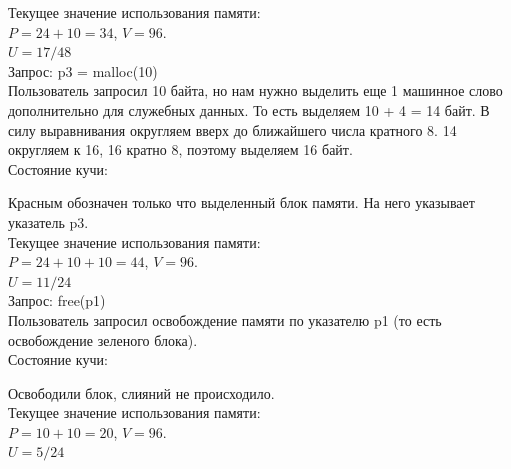 \documentclass[12pt, letterpaper]{article}
\begin{document}
Текущее значение использования памяти:\\
$P=24 + 10 = 34$, $V=96$.\\ 
$U=17/48$\\

Запрос: p3 = malloc(10)\\
Пользователь запросил 10 байта, но нам нужно выделить еще 1 машинное слово дополнительно для служебных данных. То есть выделяем 10 + 4 = 14 байт. В силу выравнивания округляем вверх до ближайшего числа кратного 8. 14 округляем к 16, 16 кратно 8, поэтому выделяем 16 байт.\\
Состояние кучи:
\begin{center}
\end{center}
Красным обозначен только что выделенный блок памяти. На него указывает указатель p3.\\

Текущее значение использования памяти:\\
$P=24 + 10 + 10 = 44$, $V=96$.\\ 
$U=11/24$\\

Запрос: free(p1)\\
Пользователь запросил освобождение памяти по указателю p1 (то есть освобождение зеленого блока).\\
Состояние кучи:
\begin{center}
\end{center}
Освободили блок, слияний не происходило.\\
Текущее значение использования памяти:\\
$P=10 + 10 = 20$, $V=96$.\\ 
$U=5/24$\\
\end{document}
